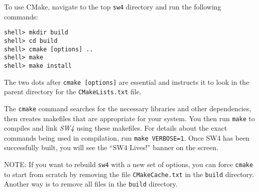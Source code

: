 \documentclass[11pt]{article}
\begin{document}
To use CMake, navigate to the top {\tt sw4} directory and run the following commands:
\begin{verbatim}
shell> mkdir build
shell> cd build
shell> cmake [options] ..
shell> make
shell> make install

\end{verbatim}
The two dots after {\tt cmake [options]} are essential and instructs it to look in the parent
directory for the {\tt CMakeLists.txt} file.
 
The \verb+cmake+ command searches for the necessary libraries and other dependencies, then creates
makefiles that are appropriate for your system. You then run \verb+make+ to compiles and link
\emph{SW4} using these makefiles. For details about the exact commands being used in compilation,
run \texttt{make VERBOSE=1}.  Once SW4 has been successfully built, you will see the
``SW4 Lives!'' banner on the screen.

NOTE: If you want to rebuild \verb+sw4+ with a new set of options, you can force \verb+cmake+ to start
from scratch by removing the file \verb+CMakeCache.txt+ in the \verb+build+ directory. Another way
is to remove all files in the \verb+build+ directory.
\end{document}
